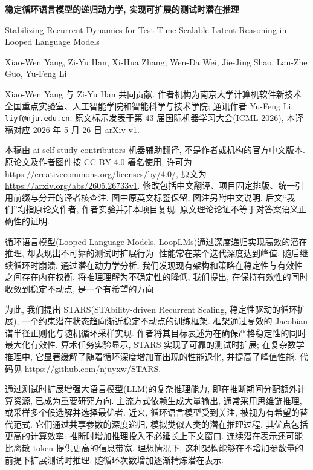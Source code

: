 \label{stars-paper}
\begin{center}
{\bfseries 稳定循环语言模型的递归动力学, 实现可扩展的测试时潜在推理}\par
Stabilizing Recurrent Dynamics for Test-Time Scalable Latent Reasoning in Looped Language Models\par
Xiao-Wen Yang, Zi-Yu Han, Xi-Hua Zhang, Wen-Da Wei, Jie-Jing Shao, Lan-Zhe Guo, Yu-Feng Li
\end{center}
Xiao-Wen Yang 与 Zi-Yu Han 共同贡献. 作者机构为南京大学计算机软件新技术全国重点实验室、人工智能学院和智能科学与技术学院; 通讯作者 Yu-Feng Li, \texttt{liyf@nju.edu.cn}. 原文标示发表于第 43 届国际机器学习大会(ICML 2026), 本译稿对应 2026 年 5 月 26 日 arXiv v1.

\begin{remark}
本稿由 ai-self-study contributors 机器辅助翻译, 不是作者或机构的官方中文版本. 原论文及作者图件按 CC BY 4.0 署名使用, 许可为 \url{https://creativecommons.org/licenses/by/4.0/}, 原文为 \url{https://arxiv.org/abs/2605.26733v1}. 修改包括中文翻译、项目固定排版、统一引用前缀与分开的译者核查注. 图中原英文标签保留, 图注另附中文说明. 后文“我们”均指原论文作者, 作者实验并非本项目复现; 原文理论论证不等于对答案语义正确性的证明.
\end{remark}

\label{stars-abstract}
循环语言模型(Looped Language Models, LoopLMs)通过深度递归实现高效的潜在推理, 却表现出不可靠的测试时扩展行为: 性能常在某个迭代深度达到峰值, 随后继续循环时崩溃. 通过潜在动力学分析, 我们发现现有架构和策略在稳定性与有效性之间存在内在权衡. 将推理理解为不确定性的降低, 我们提出, 在保持有效性的同时收敛到稳定不动点, 是一个有希望的方向.

为此, 我们提出 STARS(STAbility-driven Recurrent Scaling, 稳定性驱动的循环扩展), 一个约束潜在状态趋向渐近稳定不动点的训练框架. 框架通过高效的 Jacobian 谱半径正则化与随机循环采样实现. 作者将其目标表述为在确保严格稳定性的同时最大化有效性. 算术任务实验显示, STARS 实现了可靠的测试时扩展; 在复杂数学推理中, 它显著缓解了随着循环深度增加而出现的性能退化, 并提高了峰值性能. 代码见 \url{https://github.com/njuyxw/STARS}.

\label{stars-sec-1}
通过测试时扩展增强大语言模型(LLM)的复杂推理能力, 即在推断期间分配额外计算资源, 已成为重要研究方向\cite{stars-zhang2024llm,stars-zhang2025survey}. 主流方式依赖生成大量输出, 通常采用思维链推理\cite{stars-wei2022chain}, 或采样多个候选解并选择最优者\cite{stars-wang2022selfconsistency,stars-tot}. 近来, 循环语言模型\cite{stars-geiping2025scaling,stars-zhu2025scaling}受到关注, 被视为有希望的替代范式. 它们通过共享参数的深度递归, 模拟类似人类的潜在推理过程\cite{stars-zhu2025survey}. 其优点包括更高的计算效率: 推断时增加推理投入不必延长上下文窗口. 连续潜在表示还可能比离散 token 提供更高的信息带宽. 理想情况下, 这种架构能够在不增加参数量的前提下扩展测试时推理, 随循环次数增加逐渐精炼潜在表示\cite{stars-geiping2025scaling}.


